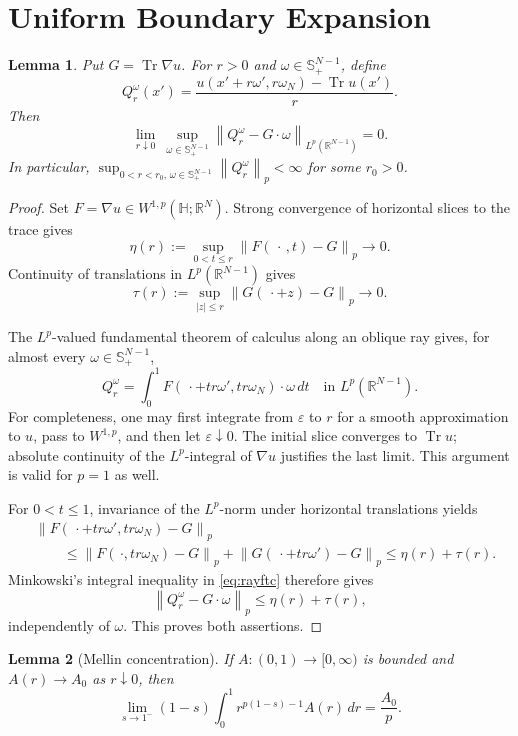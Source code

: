 \documentclass[11pt]{article}
\newtheorem{lemma}{Lemma}
\newcommand{\R}{\mathbb R}
\newcommand{\Hh}{\mathbb H}
\newcommand{\Sp}{\mathbb S^{N-1}_+}
\newcommand{\Tr}{\operatorname{Tr}}
\newcommand{\norm}[1]{\left\lVert #1\right\rVert}
\begin{document}
\section*{Uniform Boundary Expansion}

\begin{lemma}\label{lem:ray}
Put \(G=\Tr\nabla u\).  For \(r>0\) and \(\omega\in\Sp\), define
\[
 Q_r^\omega(x')
 =\frac{u(x'+r\omega',r\omega_N)-\Tr u(x')}{r}.
\]
Then
\[
 \lim_{r\downarrow0}\ 
 \sup_{\omega\in\Sp}
 \norm{Q_r^\omega-G\cdot\omega}_{L^p(\R^{N-1})}=0.
\]
In particular,
\(\sup_{0<r<r_0,\,\omega\in\Sp}\norm{Q_r^\omega}_p<\infty\)
for some \(r_0>0\).
\end{lemma}

\begin{proof}
Set \(F=\nabla u\in W^{1,p}(\Hh;\R^N)\).  Strong convergence of horizontal
slices to the trace gives
\[
 \eta(r):=\sup_{0<t\leq r}\norm{F(\,\cdot\,,t)-G}_p
 \longrightarrow0.
\]
Continuity of translations in \(L^p(\R^{N-1})\) gives
\[
 \tau(r):=\sup_{|z|\leq r}\norm{G(\,\cdot+z)-G}_p
 \longrightarrow0.
\]

The \(L^p\)-valued fundamental theorem of calculus along an oblique ray
gives, for almost every \(\omega\in\Sp\),
\begin{equation}\label{eq:rayftc}
 Q_r^\omega
 =\int_0^1
 F(\,\cdot+tr\omega',tr\omega_N)\cdot\omega\,dt
 \quad\text{in }L^p(\R^{N-1}).
\end{equation}
For completeness, one may first integrate from \(\varepsilon\) to \(r\)
for a smooth approximation to \(u\), pass to \(W^{1,p}\), and then let
\(\varepsilon\downarrow0\).  The initial slice converges to \(\Tr u\);
absolute continuity of the \(L^p\)-integral of \(\nabla u\) justifies the
last limit.  This argument is valid for \(p=1\) as well.

For \(0<t\leq1\), invariance of the \(L^p\)-norm under horizontal
translations yields
\[
\begin{split}
 &\norm{
 F(\,\cdot+tr\omega',tr\omega_N)-G}_p
\\
 &\qquad\leq
 \norm{F(\,\cdot,tr\omega_N)-G}_p
 +\norm{G(\,\cdot+tr\omega')-G}_p
 \leq\eta(r)+\tau(r).
\end{split}
\]
Minkowski's integral inequality in \eqref{eq:rayftc} therefore gives
\[
 \norm{Q_r^\omega-G\cdot\omega}_p
 \leq\eta(r)+\tau(r),
\]
independently of \(\omega\).  This proves both assertions.
\end{proof}

\begin{lemma}[Mellin concentration]\label{lem:mellin}
If \(A:(0,1)\to[0,\infty)\) is bounded and
\(A(r)\to A_0\) as \(r\downarrow0\), then
\[
 \lim_{s\to1^-}(1-s)\int_0^1
 r^{p(1-s)-1}A(r)\,dr=\frac{A_0}{p}.
\]
\end{lemma}
\end{document}
